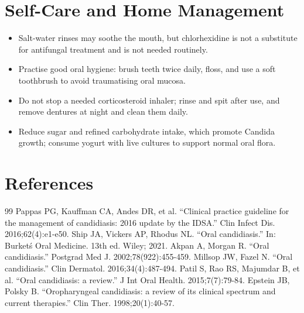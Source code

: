\section*{Self-Care and Home Management}
\begin{itemize}
  \item Salt-water rinses may soothe the mouth, but chlorhexidine is not a substitute for antifungal treatment and is not needed routinely.
  \item Practise good oral hygiene: brush teeth twice daily, floss, and use a soft toothbrush to avoid traumatising oral mucosa.
  \item Do not stop a needed corticosteroid inhaler; rinse and spit after use, and remove dentures at night and clean them daily.
  \item Reduce sugar and refined carbohydrate intake, which promote Candida growth; consume yogurt with live cultures to support normal oral flora.
\end{itemize}

\section*{References}
\begin{thebibliography}{99}
 Pappas PG, Kauffman CA, Andes DR, et al. ``Clinical practice guideline for the management of candidiasis: 2016 update by the IDSA.'' Clin Infect Dis. 2016;62(4):e1-e50.
 Ship JA, Vickers AP, Rhodus NL. ``Oral candidiasis.'' In: Burket\'s Oral Medicine. 13th ed. Wiley; 2021.
 Akpan A, Morgan R. ``Oral candidiasis.'' Postgrad Med J. 2002;78(922):455-459.
 Millsop JW, Fazel N. ``Oral candidiasis.'' Clin Dermatol. 2016;34(4):487-494.
 Patil S, Rao RS, Majumdar B, et al. ``Oral candidiasis: a review.'' J Int Oral Health. 2015;7(7):79-84.
 Epstein JB, Polsky B. ``Oropharyngeal candidiasis: a review of its clinical spectrum and current therapies.'' Clin Ther. 1998;20(1):40-57.
\end{thebibliography}
